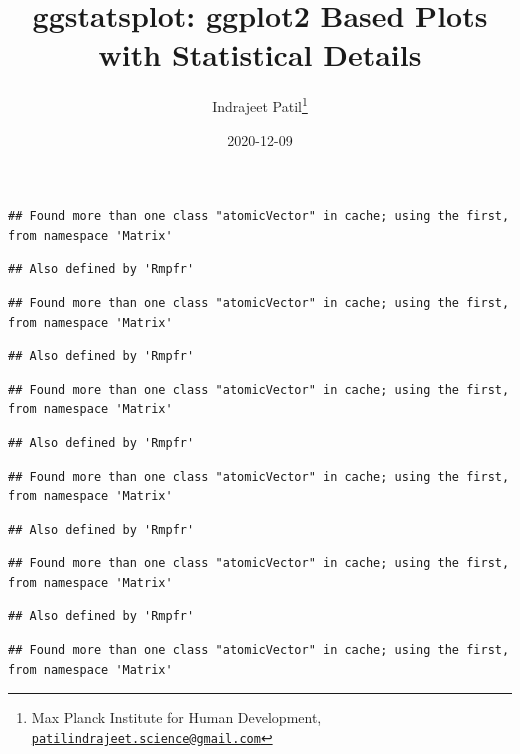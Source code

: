 \documentclass[
]{article}
\title{ggstatsplot: ggplot2 Based Plots with Statistical Details}
\author{Indrajeet Patil\footnote{Max Planck Institute for Human Development, \href{mailto:patilindrajeet.science@gmail.com}{\nolinkurl{patilindrajeet.science@gmail.com}}}}
\date{2020-12-09}
\begin{document}
\maketitle

{
\hypersetup{linkcolor=}
\setcounter{tocdepth}{2}
\tableofcontents
}
\begin{verbatim}
## Found more than one class "atomicVector" in cache; using the first, from namespace 'Matrix'
\end{verbatim}

\begin{verbatim}
## Also defined by 'Rmpfr'
\end{verbatim}

\begin{verbatim}
## Found more than one class "atomicVector" in cache; using the first, from namespace 'Matrix'
\end{verbatim}

\begin{verbatim}
## Also defined by 'Rmpfr'
\end{verbatim}

\begin{verbatim}
## Found more than one class "atomicVector" in cache; using the first, from namespace 'Matrix'
\end{verbatim}

\begin{verbatim}
## Also defined by 'Rmpfr'
\end{verbatim}

\begin{verbatim}
## Found more than one class "atomicVector" in cache; using the first, from namespace 'Matrix'
\end{verbatim}

\begin{verbatim}
## Also defined by 'Rmpfr'
\end{verbatim}

\begin{verbatim}
## Found more than one class "atomicVector" in cache; using the first, from namespace 'Matrix'
\end{verbatim}

\begin{verbatim}
## Also defined by 'Rmpfr'
\end{verbatim}

\begin{verbatim}
## Found more than one class "atomicVector" in cache; using the first, from namespace 'Matrix'
\end{verbatim}
\end{document}
